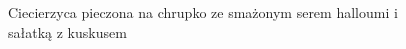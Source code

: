 \documentclass[a4paper,10pt]{book}
\begin{document}
\begin{figure}[H]
\begin{minipage}{0.4\textwidth}
        \caption{Ciecierzyca pieczona na chrupko ze smażonym serem halloumi i sałatką z kuskusem}
    \end{minipage}
    
\end{figure}
\end{document}
